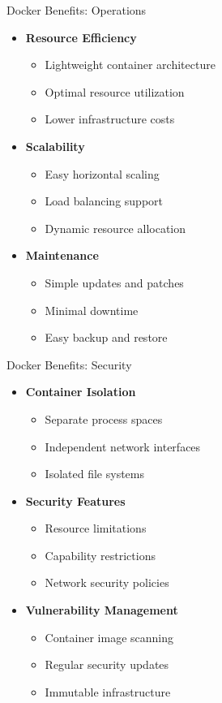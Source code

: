 \documentclass[notes]{beamer}
\begin{document}
\begin{frame}{Docker Benefits: Operations}
    \begin{itemize}
        \item \textbf{Resource Efficiency}
        \begin{itemize}
            \item Lightweight container architecture
            \item Optimal resource utilization
            \item Lower infrastructure costs
        \end{itemize}
        \item \textbf{Scalability}
        \begin{itemize}
            \item Easy horizontal scaling
            \item Load balancing support
            \item Dynamic resource allocation
        \end{itemize}
        \item \textbf{Maintenance}
        \begin{itemize}
            \item Simple updates and patches
            \item Minimal downtime
            \item Easy backup and restore
        \end{itemize}
    \end{itemize}
\end{frame}

\begin{frame}{Docker Benefits: Security}
    \begin{itemize}
        \item \textbf{Container Isolation}
        \begin{itemize}
            \item Separate process spaces
            \item Independent network interfaces
            \item Isolated file systems
        \end{itemize}
        \item \textbf{Security Features}
        \begin{itemize}
            \item Resource limitations
            \item Capability restrictions
            \item Network security policies
        \end{itemize}
        \item \textbf{Vulnerability Management}
        \begin{itemize}
            \item Container image scanning
            \item Regular security updates
            \item Immutable infrastructure
        \end{itemize}
    \end{itemize}
\end{frame}
\end{document}
